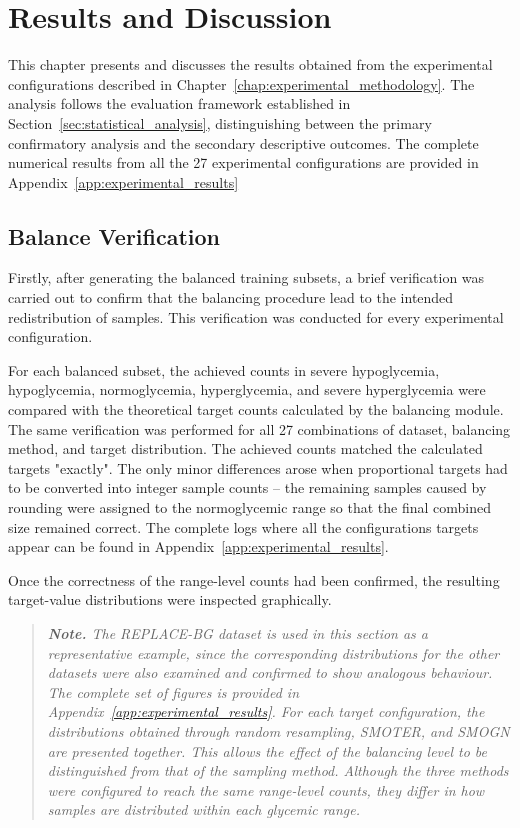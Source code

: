 
\chapter{Results and Discussion}
\label{chap:experimental_results}

This chapter presents and discusses the results obtained from the experimental configurations described in Chapter~\ref{chap:experimental_methodology}. The analysis follows the evaluation framework established in Section~\ref{sec:statistical_analysis}, distinguishing between the primary confirmatory analysis and the secondary descriptive outcomes. The complete numerical results from all the 27 experimental configurations are provided in Appendix~\ref{app:experimental_results}

\section{Balance Verification}
\label{sec:balance_verification}

Firstly, after generating the balanced training subsets, a brief verification was carried out to confirm that the balancing procedure lead to the intended redistribution of samples. This verification was conducted for every experimental configuration.

For each balanced subset, the achieved counts in severe hypoglycemia, hypoglycemia, normoglycemia, hyperglycemia, and severe hyperglycemia were compared with the theoretical target counts calculated by the balancing module. The same verification was performed for all 27 combinations of dataset, balancing method, and target distribution. The achieved counts matched the calculated targets "exactly". The only minor differences arose when proportional targets had to be converted into integer sample counts -- the remaining samples caused by rounding were assigned to the normoglycemic range so that the final combined size remained correct. The complete logs where all the configurations targets appear can be found in Appendix~\ref{app:experimental_results}.

Once the correctness of the range-level counts had been confirmed, the resulting target-value distributions were inspected graphically.

\begin{quote}
\small
\textit{\textbf{Note.} The REPLACE-BG dataset is used in this section as a representative example, since the corresponding distributions for the other datasets were also examined and confirmed to show analogous behaviour. The complete set of figures is provided in Appendix~\ref{app:experimental_results}. For each target configuration, the distributions obtained through random resampling, SMOTER, and SMOGN are presented together. This allows the effect of the balancing level to be distinguished from that of the sampling method. Although the three methods were configured to reach the same range-level counts, they differ in how samples are distributed within each glycemic range.}
\end{quote}


